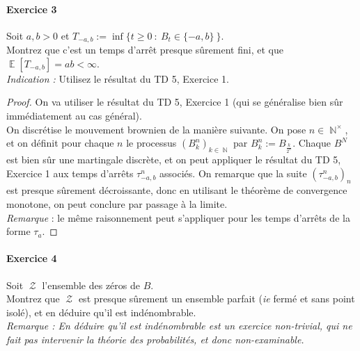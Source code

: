 \documentclass{article}
\theoremstyle{definition}
\numberwithin{equation}{section}
\DeclareMathOperator{\N}{\mathbb{N}}
\DeclareMathOperator{\E}{\mathbb{E}}
\DeclareMathOperator{\Zz}{\mathcal{Z}}
\begin{document}
\paragraph{Exercice 3}
Soit $a,b>0$ et $T_{-a,b}:=\inf\{t\geq 0~:~B_t\in\{-a,b\}~\}$.\\
Montrez que c'est un temps d'arrêt presque sûrement fini, et que $\E[T_{-a,b}]=ab<\infty$.\\
\textit{Indication :} Utilisez le résultat du TD 5, Exercice 1.

\begin{proof}
On va utiliser le résultat du TD 5, Exercice 1 (qui se généralise bien sûr immédiatement au cas général).\\
On discrétise le mouvement brownien de la manière suivante. On pose $n\in\N^\times$, et on définit pour chaque $n$ le processus $(B^n_k)_{k\in\N}$ par $B^n_k:=B_{\frac{k}{2^n}}$. Chaque $B^N$ est bien sûr une martingale discrète, et on peut appliquer le résultat du TD 5, Exercice 1 aux temps d'arrêts $\tau^n_{-a,b}$ associés. On remarque que la suite $(\tau^n_{-a,b})_n$ est presque sûrement décroissante, donc en utilisant le théorème de convergence monotone, on peut conclure par passage à la limite.\\
\textit{Remarque} : le même raisonnement peut s'appliquer pour les temps d'arrêts de la forme $\tau_a$.
\end{proof}


\paragraph{Exercice 4}
Soit $\Zz$ l'ensemble des zéros de $B$.\\
Montrez que $\Zz$ est presque sûrement un ensemble parfait (\textit{ie} fermé et sans point isolé), et en déduire qu'il est indénombrable.\\
\textit{Remarque : En déduire qu'il est indénombrable est un exercice non-trivial, qui ne fait pas intervenir la théorie des probabilités, et donc non-examinable.}
\end{document}
